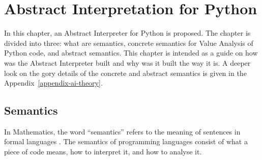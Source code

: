 \chapter{Abstract Interpretation for Python}\label{ai-for-python}



In this chapter, an Abstract Interpreter for Python is proposed. The chapter is divided
into three: what are semantics, concrete semantics for Value Analysis of Python code, and
abstract semantics. This chapter is intended as a guide on how was the Abstract
Interpreter built and why was it built the way it is. A deeper look on the gory details
of the concrete and abstract semantics is given in the Appendix~\ref{appendix-ai-theory}.

\section{Semantics}

In Mathematics, the word \enquote{semantics} refers to the meaning of sentences in formal
languages \autocite{gunter_semantics_1992}. The semantics of programming languages
consist of what a piece of code means, how to interpret it, and how to analyse it.

